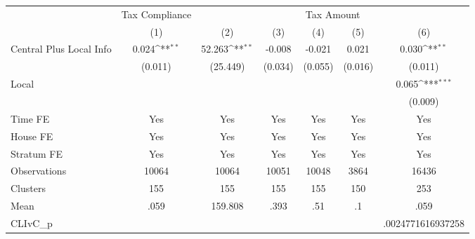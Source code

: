 {
\def\sym#1{\ifmmode^{#1}\else\(^{#1}\)\fi}
\begin{tabular}{l*{6}{c}}
\hline\hline
                &\multicolumn{1}{c}{Tax Compliance}&\multicolumn{5}{c}{Tax Amount}                                                                \\
                &\multicolumn{1}{c}{(1)}         &\multicolumn{1}{c}{(2)}         &\multicolumn{1}{c}{(3)}         &\multicolumn{1}{c}{(4)}         &\multicolumn{1}{c}{(5)}         &\multicolumn{1}{c}{(6)}         \\
\hline
Central Plus Local Info&    0.024\sym{**} &   52.263\sym{**} &   -0.008         &   -0.021         &    0.021         &    0.030\sym{**} \\
                &  (0.011)         & (25.449)         &  (0.034)         &  (0.055)         &  (0.016)         &  (0.011)         \\
Local           &                  &                  &                  &                  &                  &    0.065\sym{***}\\
                &                  &                  &                  &                  &                  &  (0.009)         \\
Time FE         &      Yes         &      Yes         &      Yes         &      Yes         &      Yes         &      Yes         \\
House FE        &      Yes         &      Yes         &      Yes         &      Yes         &      Yes         &      Yes         \\
Stratum FE      &      Yes         &      Yes         &      Yes         &      Yes         &      Yes         &      Yes         \\
\hline
Observations    &    10064         &    10064         &    10051         &    10048         &     3864         &    16436         \\
Clusters        &      155         &      155         &      155         &      155         &      150         &      253         \\
Mean            &     .059         &  159.808         &     .393         &      .51         &       .1         &     .059         \\
CLIvC\_p         &                  &                  &                  &                  &                  &.0024771616937258         \\
\hline\hline
\end{tabular}
}
